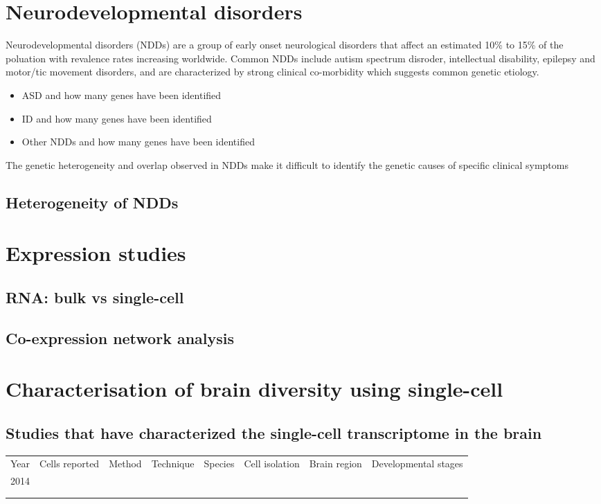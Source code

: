 \documentclass[12pt]{article}
\begin{document}
\section{Neurodevelopmental disorders}

Neurodevelopmental disorders (NDDs) are a group of early onset neurological disorders that affect an estimated 10\% to 15\% of the poluation with revalence rates increasing worldwide.
Common NDDs include autism spectrum disroder, intellectual disability, epilepsy and motor/tic movement disorders, and are characterized by strong clinical co-morbidity which suggests common genetic etiology. 

\begin{itemize}
	\item ASD and how many genes have been identified 
	\item ID and how many genes have been identified 
	\item Other NDDs and how many genes have been identified 
\end{itemize}
The genetic heterogeneity and overlap observed in NDDs make it difficult to identify the genetic causes of specific clinical symptoms


\subsection{Heterogeneity of NDDs}
\section{Expression studies}
\subsection{RNA: bulk vs single-cell}
\subsection{Co-expression network analysis}

\section{Characterisation of brain diversity using single-cell}
\subsection{Studies that have characterized the single-cell transcriptome in the brain}

\begin{table}[]
	\begin{tabular}{llllllll}
		Year & Cells reported  & Method  & Technique  & Species  &  Cell isolation & Brain region & Developmental stages\\
		2014 &  &  &  & & & & \\
		&  &  &  & &&& \\
		&  &  &  & &&&
	\end{tabular}
\end{table}
\end{document}
